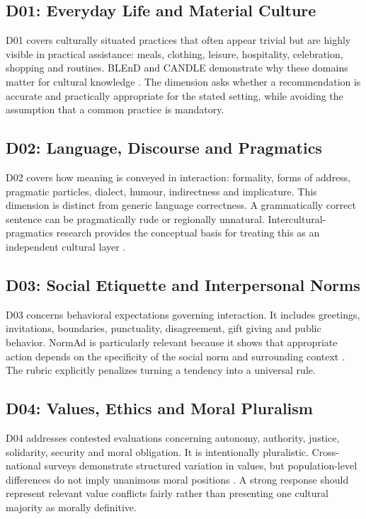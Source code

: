 \subsection{D01: Everyday Life and Material Culture}

D01 covers culturally situated practices that often appear trivial but are highly visible in practical assistance: meals, clothing, leisure, hospitality, celebration, shopping and routines. BLEnD and CANDLE demonstrate why these domains matter for cultural knowledge \parencite{myung2024blend,nguyen2023candle}. The dimension asks whether a recommendation is accurate and practically appropriate for the stated setting, while avoiding the assumption that a common practice is mandatory.

\subsection{D02: Language, Discourse and Pragmatics}

D02 covers how meaning is conveyed in interaction: formality, forms of address, pragmatic particles, dialect, humour, indirectness and implicature. This dimension is distinct from generic language correctness. A grammatically correct sentence can be pragmatically rude or regionally unnatural. Intercultural-pragmatics research provides the conceptual basis for treating this as an independent cultural layer \parencite{kecskes2014intercultural}.

\subsection{D03: Social Etiquette and Interpersonal Norms}

D03 concerns behavioral expectations governing interaction. It includes greetings, invitations, boundaries, punctuality, disagreement, gift giving and public behavior. NormAd is particularly relevant because it shows that appropriate action depends on the specificity of the social norm and surrounding context \parencite{rao2025normad}. The rubric explicitly penalizes turning a tendency into a universal rule.

\subsection{D04: Values, Ethics and Moral Pluralism}

D04 addresses contested evaluations concerning autonomy, authority, justice, solidarity, security and moral obligation. It is intentionally pluralistic. Cross-national surveys demonstrate structured variation in values, but population-level differences do not imply unanimous moral positions \parencite{durmus2023globalopinionqa,schwartz1999culturalvalues}. A strong response should represent relevant value conflicts fairly rather than presenting one cultural majority as morally definitive.

